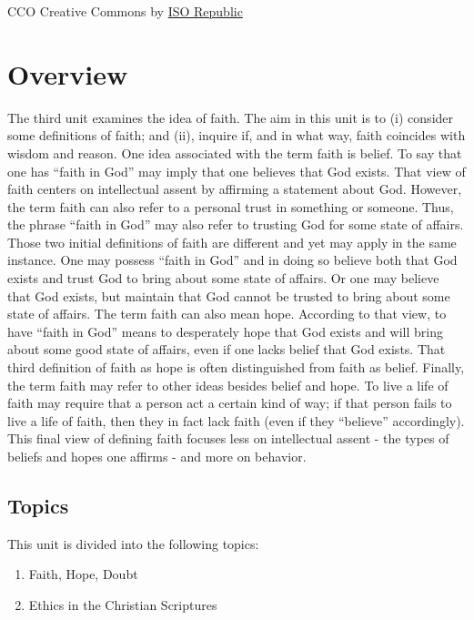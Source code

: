 \documentclass[
]{book}
\providecommand{\tightlist}{%
  \setlength{\itemsep}{0pt}\setlength{\parskip}{0pt}}
\begin{document}
CCO Creative Commons by \href{https://isorepublic.com/photo/hand-reach/}{ISO Republic}

\hypertarget{overview-2}{%
\section{Overview}\label{overview-2}}

The third unit examines the idea of faith. The aim in this unit is to (i) consider some definitions of faith; and (ii), inquire if, and in what way, faith coincides with wisdom and reason. One idea associated with the term faith is belief. To say that one has ``faith in God'' may imply that one believes that God exists. That view of faith centers on intellectual assent by affirming a statement about God. However, the term faith can also refer to a personal trust in something or someone. Thus, the phrase ``faith in God'' may also refer to trusting God for some state of affairs. Those two initial definitions of faith are different and yet may apply in the same instance. One may possess ``faith in God'' and in doing so believe both that God exists and trust God to bring about some state of affairs. Or one may believe that God exists, but maintain that God cannot be trusted to bring about some state of affairs. The term faith can also mean hope. According to that view, to have ``faith in God'' means to desperately hope that God exists and will bring about some good state of affairs, even if one lacks belief that God exists. That third definition of faith as hope is often distinguished from faith as belief. Finally, the term faith may refer to other ideas besides belief and hope. To live a life of faith may require that a person act a certain kind of way; if that person fails to live a life of faith, then they in fact lack faith (even if they ``believe'' accordingly). This final view of defining faith focuses less on intellectual assent - the types of beliefs and hopes one affirms - and more on behavior.

\hypertarget{topics-1}{%
\subsection*{Topics}\label{topics-1}}

This unit is divided into the following topics:

\begin{enumerate}
\def\labelenumi{\arabic{enumi}.}
\tightlist
\item
  Faith, Hope, Doubt
\item
  Ethics in the Christian Scriptures
\end{enumerate}
\end{document}
